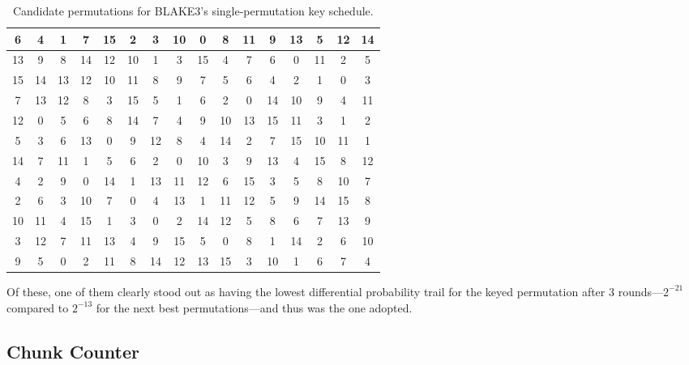 \documentclass[11pt,notitlepage,a4paper]{article}
\begin{document}
\begin{table}
\centering
\caption{Candidate permutations for BLAKE3's single-permutation key schedule.}\label{tab:candidates}
\begin{tabular}{cccccccccccccccc}
\toprule
6 & 4 & 1 & 7 & 15 & 2 & 3 & 10 & 0 & 8 & 11 & 9 & 13 & 5 & 12 & 14\\
\midrule
13 & 9 & 8 & 14 & 12 & 10 & 1 & 3 & 15 & 4 & 7 & 6 & 0 & 11 & 2 & 5\\
\midrule
15 & 14 & 13 & 12 & 10 & 11 & 8 & 9 & 7 & 5 & 6 & 4 & 2 & 1 & 0 & 3\\
\midrule
7 & 13 & 12 & 8 & 3 & 15 & 5 & 1 & 6 & 2 & 0 & 14 & 10 & 9 & 4 & 11\\
\midrule
12 & 0 & 5 & 6 & 8 & 14 & 7 & 4 & 9 & 10 & 13 & 15 & 11 & 3 & 1 & 2\\
\midrule
5 & 3 & 6 & 13 & 0 & 9 & 12 & 8 & 4 & 14 & 2 & 7 & 15 & 10 & 11 & 1\\
\midrule
14 & 7 & 11 & 1 & 5 & 6 & 2 & 0 & 10 & 3 & 9 & 13 & 4 & 15 & 8 & 12\\
\midrule
4 & 2 & 9 & 0 & 14 & 1 & 13 & 11 & 12 & 6 & 15 & 3 & 5 & 8 & 10 & 7\\
\midrule
2 & 6 & 3 & 10 & 7 & 0 & 4 & 13 & 1 & 11 & 12 & 5 & 9 & 14 & 15 & 8\\
\midrule
10 & 11 & 4 & 15 & 1 & 3 & 0 & 2 & 14 & 12 & 5 & 8 & 6 & 7 & 13 & 9\\
\midrule
3 & 12 & 7 & 11 & 13 & 4 & 9 & 15 & 5 & 0 & 8 & 1 & 14 & 2 & 6 & 10\\
\midrule
9 & 5 & 0 & 2 & 11 & 8 & 14 & 12 & 13 & 15 & 3 & 10 & 1 & 6 & 7 & 4\\ \bottomrule
\end{tabular}
\end{table}
Of these, one of them clearly stood out as having the lowest differential probability trail for the keyed permutation after 3 rounds---$2^{-21}$ compared to $2^{-13}$ for the next best permutations---and thus was the one adopted.


\subsection{Chunk Counter}\label{sec:chunkcounter}
\end{document}
